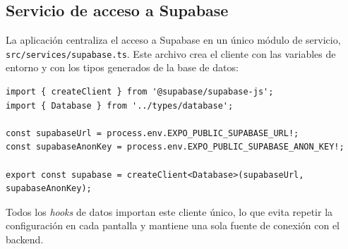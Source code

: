 \subsection{Servicio de acceso a Supabase}

La aplicaci\'on centraliza el acceso a Supabase en un \'unico m\'odulo de
servicio, \texttt{src/services/supabase.ts}. Este archivo crea el cliente
con las variables de entorno y con los tipos generados de la base de
datos:

\begin{lstlisting}
import { createClient } from '@supabase/supabase-js';
import { Database } from '../types/database';

const supabaseUrl = process.env.EXPO_PUBLIC_SUPABASE_URL!;
const supabaseAnonKey = process.env.EXPO_PUBLIC_SUPABASE_ANON_KEY!;

export const supabase = createClient<Database>(supabaseUrl, supabaseAnonKey);
\end{lstlisting}

Todos los \textit{hooks} de datos importan este cliente \'unico, lo que
evita repetir la configuraci\'on en cada pantalla y mantiene una sola
fuente de conexi\'on con el backend.